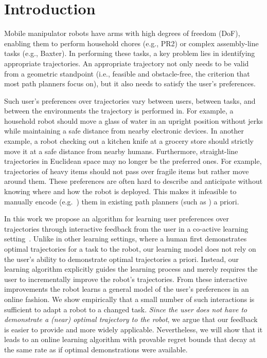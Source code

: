 \section{Introduction}

Mobile manipulator robots have arms with high degrees of freedom (DoF), enabling them to perform household chores (e.g., PR2) or complex assembly-line tasks (e.g., Baxter). In performing these tasks, a key problem lies in identifying appropriate trajectories. An appropriate trajectory not only needs to be valid from a geometric standpoint (i.e., feasible and obstacle-free, the criterion that most path planners focus on), but it also needs to satisfy the user's preferences.

Such user's preferences over trajectories vary between users, between tasks, and between the environments the trajectory is performed in. For example, a household robot should move a glass of water in an upright position without jerks while maintaining a safe distance from nearby electronic devices. In another example, a robot checking out a kitchen knife at a grocery store should strictly move it at a safe distance from nearby humans. Furthermore, straight-line trajectories in Euclidean space may no longer be the preferred ones. For example, trajectories of heavy items should not pass over fragile items but rather move around them. These preferences are often hard to describe and anticipate without knowing where and how the robot is deployed. This makes it infeasible to manually encode (e.g.~\citep{Koppula13}) them in existing path planners (such as \cite{Chomp,Ompl}) a priori.

In this work we propose an algorithm for learning user preferences over trajectories through interactive feedback from the user in a co-active learning setting~\citep{Shivaswamy12}. Unlike in other learning settings, where a human first demonstrates optimal trajectories for a task to the robot, our learning model does not rely on the user's ability to demonstrate optimal trajectories a priori. Instead, our learning algorithm explicitly guides the learning process and merely requires the user to incrementally improve the robot's trajectories. From these interactive improvements the robot learns a general model of the user's preferences in an online fashion. We show empirically that a small number of such interactions is sufficient to adapt a robot to a changed task. \textit{Since the user does not have to demonstrate a (near) optimal trajectory to the robot}, we argue that our feedback is easier to provide and more widely applicable. Nevertheless, we will show that it leads to an online learning algorithm with provable regret bounds that decay at the same rate as if optimal demonstrations were available. 

